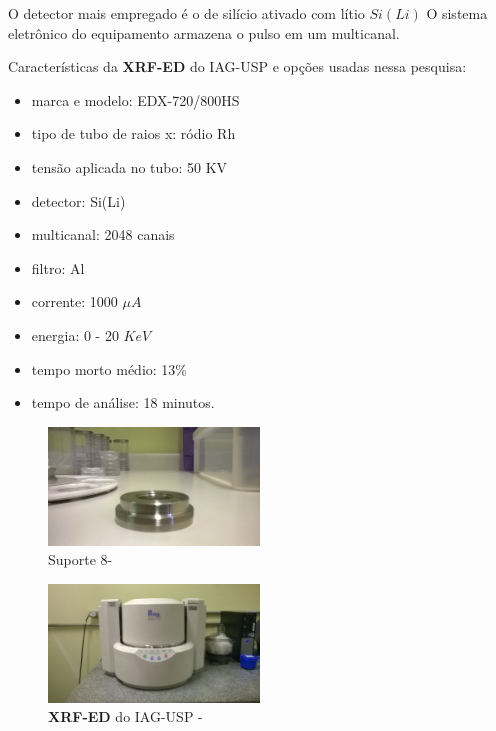 O detector mais empregado é o de silício ativado com lítio $Si(Li)$ 
O sistema eletrônico do equipamento armazena o pulso em um multicanal.

Características da \textbf{XRF-ED} do IAG-USP e opções usadas nessa pesquisa:
\begin{itemize}
  \item marca e modelo: EDX-720/800HS
  \item tipo de tubo de raios x: ródio Rh
  \item tensão aplicada no tubo: 50 KV 
  \item detector: Si(Li)
  \item multicanal: 2048 canais
  \item filtro: Al
  \item corrente: 1000 $\mu A$
  \item energia: 0 - 20 $KeV$ 
  \item tempo morto médio: 13\%
  \item tempo de análise: 18 minutos.
\end{itemize}

\begin{figure}[H]
\begin{center}
  \includegraphics[width=0.5\textwidth]{../inputs/images/suporte8.jpg}
  \caption{Suporte 8- \label{fig:suporte8}}
\end{center}
\end{figure}

\begin{figure}[H]
\begin{center}
  \includegraphics[width=0.5\textwidth]{../inputs/images/xrf-ed-IAG-USP.jpg}
  \caption{\textbf{XRF-ED} do IAG-USP - \label{fig:xrfed_iag}}
\end{center}
\end{figure}



